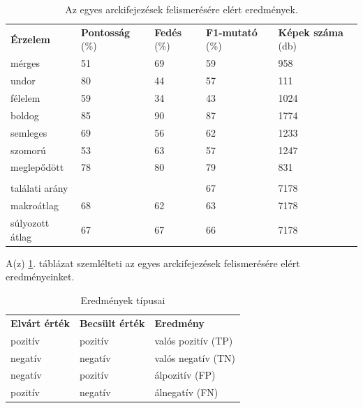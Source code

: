 \documentclass[12pt,a4]{article}
\begin{document}
            \begin{table}[htb] 
                \begin{tabular}{lllll}
                \textbf{Érzelem}     & \textbf{Pontosság} (\%) & \textbf{Fedés} (\%) & \textbf{F1-mutató} (\%) & \textbf{Képek száma} (db) \\
                mérges      & 51             & 69               & 59             & 958              \\
                undor       & 80             & 44               & 57             & 111              \\
                félelem     & 59             & 34               & 43             & 1024             \\
                boldog      & 85             & 90               & 87             & 1774             \\
                semleges    & 69             & 56               & 62             & 1233             \\
                szomorú     & 53             & 63               & 57             & 1247             \\
                meglepődött & 78             & 80               & 79             & 831             \\
                \\
                találati arány  &    &   & 67    & 7178 \\
                makroátlag  &68    &62   & 63    & 7178 \\
                súlyozott átlag  &67    &67   & 66    & 7178 \\
                \end{tabular}
                \caption{Az egyes arckifejezések felismerésére elért eredmények.}
                \label{fig:fec-result-table}
            \end{table}

            A(z) \ref{fig:fec-result-table}. táblázat szemlélteti az egyes arckifejezések felismerésére elért eredményeinket.
            
            \begin{table}[htb] 
                
                \begin{tabular}{lll}
                \textbf{Elvárt érték} & \textbf{Becsült érték} & \textbf{Eredmény}      \\
                pozitív      & pozitív       & valós pozitív (TP) \\
                negatív      & negatív       & valós negatív (TN) \\
                negatív      & pozitív       & álpozitív (FP)     \\
                pozitív      & negatív       & álnegatív (FN)    
                \end{tabular}
                \caption{Eredmények típusai}
                \label{fig:cf-result-types}
            \end{table}
\end{document}
